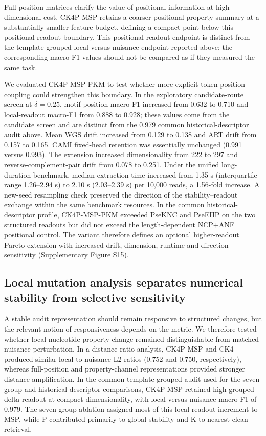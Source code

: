Full-position matrices clarify the value of positional information at high dimensional cost. CK4P-MSP retains a coarser positional property summary at a substantially smaller feature budget, defining a compact point below this positional-readout boundary. This positional-readout endpoint is distinct from the template-grouped local-versus-nuisance endpoint reported above; the corresponding macro-F1 values should not be compared as if they measured the same task.

We evaluated CK4P-MSP-PKM to test whether more explicit token-position coupling could strengthen this boundary. In the exploratory candidate-route screen at $\delta=0.25$, motif-position macro-F1 increased from 0.632 to 0.710 and local-readout macro-F1 from 0.888 to 0.928; these values come from the candidate screen and are distinct from the 0.979 common historical-descriptor audit above. Mean WGS drift increased from 0.129 to 0.138 and ART drift from 0.157 to 0.165. CAMI fixed-head retention was essentially unchanged (0.991 versus 0.993). The extension increased dimensionality from 222 to 297 and reverse-complement-pair drift from 0.078 to 0.251. Under the unified long-duration benchmark, median extraction time increased from 1.35 s (interquartile range 1.26--2.94 s) to 2.10 s (2.03--2.39 s) per 10,000 reads, a 1.56-fold increase. A new-seed resampling check preserved the direction of the stability--readout exchange within the same benchmark resources. In the common historical-descriptor profile, CK4P-MSP-PKM exceeded PseKNC and PseEIIP on the two structured readouts but did not exceed the length-dependent NCP+ANF positional control. The variant therefore defines an optional higher-readout Pareto extension with increased drift, dimension, runtime and direction sensitivity (Supplementary Figure S15).

\subsection{Local mutation analysis separates numerical stability from selective sensitivity}

A stable audit representation should remain responsive to structured changes, but the relevant notion of responsiveness depends on the metric. We therefore tested whether local nucleotide-property change remained distinguishable from matched nuisance perturbation. In a distance-ratio analysis, CK4P-MSP and CK4 produced similar local-to-nuisance L2 ratios (0.752 and 0.750, respectively), whereas full-position and property-channel representations provided stronger distance amplification. In the common template-grouped audit used for the seven-group and historical-descriptor comparisons, CK4P-MSP retained high grouped delta-readout at compact dimensionality, with local-versus-nuisance macro-F1 of 0.979. The seven-group ablation assigned most of this local-readout increment to MSP, while P contributed primarily to global stability and K to nearest-clean retrieval.

